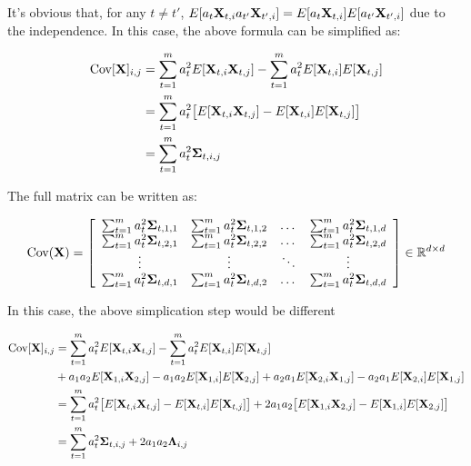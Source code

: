 \documentclass[11pt]{article}
\begin{document}
It's obvious that, for any $t \neq t'$, $E[a_{t}\mathbf{X}_{t,i} a_{t'}\mathbf{X}_{t', i}] = E[a_{t}\mathbf{X}_{t,i}] E[a_{t'}\mathbf{X}_{t', i}] $ due to the independence. In this case, the above formula can be simplified as:

\begin{align*}
	\text{Cov}[\mathbf{X}]_{i,j} &= \sum_{t=1}^{m} a_t^2 E[\mathbf{X}_{t,i} \mathbf{X}_{t,j}] - \sum_{t=1}^{m} a_t^2 E[\mathbf{X}_{t,i}] E[\mathbf{X}_{t,j}] \\
	&= \sum_{t=1}^{m} a_t^2 \big[E[\mathbf{X}_{t,i} \mathbf{X}_{t,j}] - E[\mathbf{X}_{t,i}] E[\mathbf{X}_{t,j}]\big] \\
	&= \sum_{t=1}^{m} a_t^2 \boldsymbol{\Sigma}_{t,i,j}
\end{align*}


 
The full matrix can be written as:
 
\begin{align*}
\text{Cov}(\mathbf{X}) = \left[ \begin{array}{cccc}
\sum^m_{t=1}a_t^2 \boldsymbol{\Sigma}_{t,1,1} & \sum_{t=1}^{m} a_t^2 \boldsymbol{\Sigma}_{t,1,2} & \dots & \sum_{t=1}^{m} a_t^2 \boldsymbol{\Sigma}_{t,1,d}\\
\sum_{t=1}^{m} a_t^2 \boldsymbol{\Sigma}_{t,2,1} & \sum^m_{t=1}a_t^2 \boldsymbol{\Sigma}_{t,2,2} & \dots & \sum_{t=1}^{m} a_t^2 \boldsymbol{\Sigma}_{t,2,d}\\
\vdots & \vdots & \ddots & \vdots\\
\sum_{t=1}^{m} a_t^2 \boldsymbol{\Sigma}_{t,d,1} & \sum_{t=1}^{m} a_t^2 \boldsymbol{\Sigma}_{t,d,2} & \dots & \sum^m_{t=1}a_t^2 \boldsymbol{\Sigma}_{t,d,d}
\end{array} \right]
\in \mathbb{R}^{d\times d}
\end{align*}

In this case, the above simplication step would be different

\begin{align*}
\text{Cov}[\mathbf{X}]_{i,j} &= \sum_{t=1}^{m} a_t^2 E[\mathbf{X}_{t,i} \mathbf{X}_{t,j}] - \sum_{t=1}^{m} a_t^2 E[\mathbf{X}_{t,i}] E[\mathbf{X}_{t,j}] \\
& + a_1a_2E[\mathbf{X}_{1,i}\mathbf{X}_{2,j}]-a_1a_2E[\mathbf{X}_{1,i}]E[\mathbf{X}_{2,j}]
+ a_2a_1E[\mathbf{X}_{2,i}\mathbf{X}_{1,j}]-a_2a_1E[\mathbf{X}_{2,i}]E[\mathbf{X}_{1,j}]
 \\
&= \sum_{t=1}^{m} a_t^2 \big[E[\mathbf{X}_{t,i} \mathbf{X}_{t,j}] - E[\mathbf{X}_{t,i}] E[\mathbf{X}_{t,j}]\big] + 2a_1a_2\big[E[\mathbf{X}_{1,i}\mathbf{X}_{2,j}]-E[\mathbf{X}_{1,i}]E[\mathbf{X}_{2,j}]\big]
\\
&= \sum_{t=1}^{m} a_t^2 \boldsymbol{\Sigma}_{t,i,j} +2a_1a_2\boldsymbol{\Lambda}_{i,j}
\end{align*}
\end{document}
